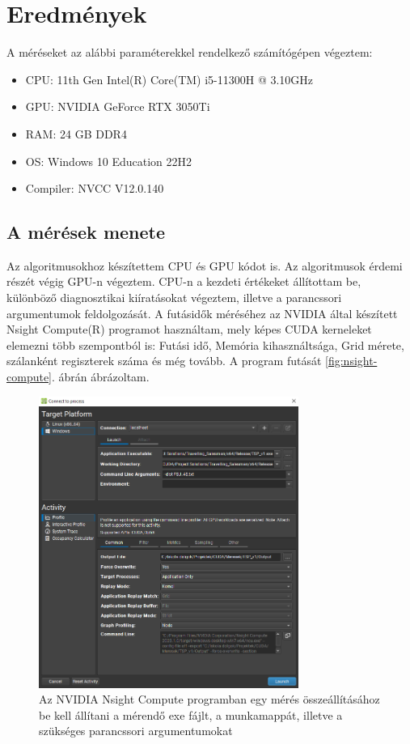 \chapter{Eredmények} \label{resultsChapter}

A méréseket az alábbi paraméterekkel rendelkező számítógépen végeztem:
\begin{itemize}
	\item	CPU: 11th Gen Intel(R) Core(TM) i5-11300H @ 3.10GHz
	\item	GPU: NVIDIA GeForce RTX 3050Ti 
	\item	RAM: 24 GB DDR4 
	\item	OS: Windows 10 Education 22H2 
	\item	Compiler: NVCC V12.0.140
	
\end{itemize}

\section{A mérések menete}
Az algoritmusokhoz készítettem CPU és GPU kódot is. Az algoritmusok érdemi részét végig GPU-n végeztem. CPU-n a kezdeti értékeket állítottam be, különböző diagnosztikai kiíratásokat végeztem, illetve a parancssori argumentumok feldolgozását. A futásidők méréséhez az NVIDIA által készített Nsight Compute(R) programot használtam, mely képes CUDA kerneleket elemezni több szempontból is: Futási idő, Memória kihasználtsága, Grid mérete, szálanként regiszterek száma és még tovább. A program futását \ref{fig:nsight-compute}. ábrán ábrázoltam. 

\begin{figure}[ht!]
	\centering
	\includegraphics[width=85mm, keepaspectratio]{figures/nsight-compute-config.png}
	\caption{Az NVIDIA Nsight Compute programban egy mérés összeállításához be kell állítani a mérendő exe fájlt, a munkamappát, illetve a szükséges parancssori argumentumokat}
	\label{fig:nsight-compute-config}
\end{figure}


